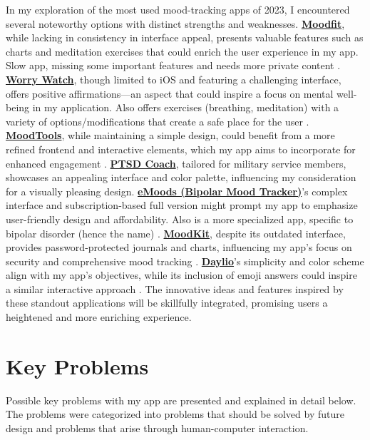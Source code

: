 \documentclass[11pt]{report}
\begin{document}
In my exploration of the most used mood-tracking apps of 2023, I encountered several noteworthy options with distinct strengths and weaknesses. \textbf{\href{https://www.getmoodfit.com/}{Moodfit}}, while lacking in consistency in interface appeal, presents valuable features such as charts and meditation exercises that could enrich the user experience in my app. Slow app, missing some important features and needs more private content \cite{moodfit-review}. \textbf{\href{https://worrywatch.com/}{Worry Watch}}, though limited to iOS and featuring a challenging interface, offers positive affirmations—an aspect that could inspire a focus on mental well-being in my application. Also offers exercises (breathing, meditation) with a variety of options/modifications that create a safe place for the user \cite{worrywatch-review}. \textbf{\href{https://www.moodtools.org/}{MoodTools}}, while maintaining a simple design, could benefit from a more refined frontend and interactive elements, which my app aims to incorporate for enhanced engagement \cite{moodtools-review}. \textbf{\href{https://mobile.va.gov/app/ptsd-coach}{PTSD Coach}}, tailored for military service members, showcases an appealing interface and color palette, influencing my consideration for a visually pleasing design. \textbf{\href{https://emoodtracker.com/}{eMoods (Bipolar Mood Tracker)}}'s complex interface and subscription-based full version might prompt my app to emphasize user-friendly design and affordability. Also is a more specialized app, specific to bipolar disorder (hence the name) \cite{emoods-review}. \textbf{\href{https://www.thriveport.com/products/moodkit/}{MoodKit}}, despite its outdated interface, provides password-protected journals and charts, influencing my app's focus on security and comprehensive mood tracking \cite{moodkit-review}. \textbf{\href{https://daylio.net/}{Daylio}}'s simplicity and color scheme align with my app's objectives, while its inclusion of emoji answers could inspire a similar interactive approach \cite{daylio-review}. The innovative ideas and features inspired by these standout applications will be skillfully integrated, promising users a heightened and more enriching experience.

\section{Key Problems}

Possible key problems with my app are presented and explained in detail below. The problems were categorized into problems that should be solved by future design and problems that arise through human-computer interaction.
\end{document}
